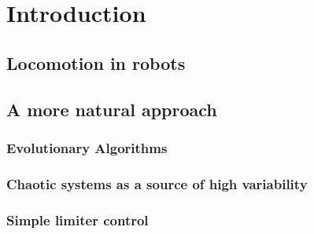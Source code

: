 \documentclass[main]{subfiles}
\begin{document}
\setcounter{chapter}{0}

\chapter{Introduction} %

\label{Chapter\thechapter} %



\section{Locomotion in robots}

\lipsum[1]


\section{A more natural approach}

\lipsum[1]

\subsection{Evolutionary Algorithms}

\lipsum[1]

\subsection{Chaotic systems as a source of high variability}

\lipsum[1]


\subsection{Simple limiter control}

\lipsum[1]

\end{document}
